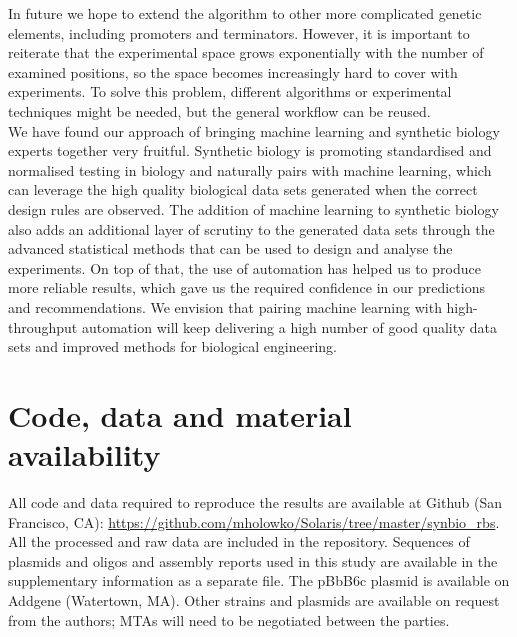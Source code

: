 \documentclass{article}
\begin{document}
In future we hope to extend the algorithm to other more complicated genetic elements, including promoters and terminators.
However, it is important to reiterate that the experimental space grows exponentially with the number of examined positions, so the space becomes increasingly hard to cover with experiments.
To solve this problem, different algorithms or experimental techniques might be needed, but the general workflow can be reused.\\


We have found our approach of bringing machine learning and synthetic biology experts together very fruitful.
Synthetic biology is promoting standardised and normalised testing in biology and naturally pairs with machine learning, which can leverage the high quality biological data sets generated when the correct design rules are observed.
The addition of machine learning to synthetic biology also adds an additional layer of scrutiny to the generated data sets through the advanced statistical methods that can be used to design and analyse the experiments.
On top of that, the use of automation has helped us to produce more reliable results, which gave us the required confidence in our predictions and recommendations.
We envision that pairing machine learning with high-throughput automation will keep delivering a high number of good quality data sets and improved methods for biological engineering.\\




\section*{Code, data and material availability}

All code and data required to reproduce the results are available at Github (San Francisco, CA): \url{https://github.com/mholowko/Solaris/tree/master/synbio_rbs}.
All the processed and raw data are included in the repository.
Sequences of plasmids and oligos and assembly reports used in this study are available in the supplementary information as a separate file.
The pBbB6c plasmid is available on Addgene (Watertown, MA). Other strains and plasmids are available on request from the authors; MTAs will need to be negotiated between the parties.
\end{document}
